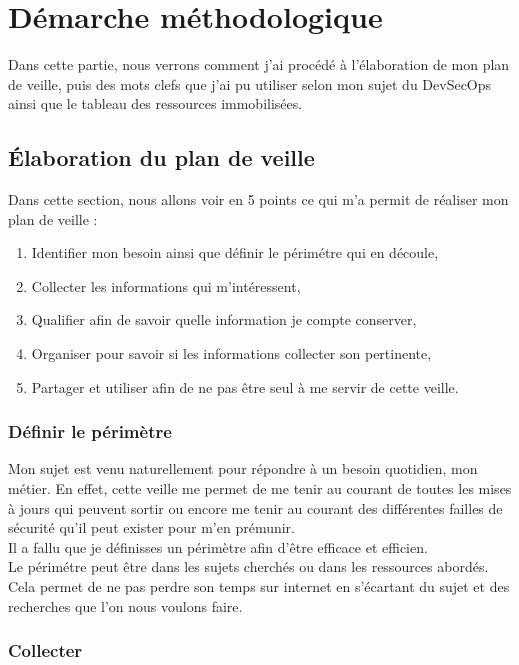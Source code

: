 \documentclass[11pt,a4paper,oneside]{book}
\begin{document}
\chapter{Démarche méthodologique}

Dans cette partie, nous verrons comment j'ai procédé à l'élaboration de mon plan de veille, puis des mots clefs que j'ai pu utiliser selon mon sujet du DevSecOps ainsi que le tableau des ressources immobilisées.

\section{Élaboration du plan de veille}

Dans cette section, nous allons voir en 5 points ce qui m'a permit de réaliser mon plan de veille :
\begin{enumerate}
\item Identifier mon besoin ainsi que définir le périmétre qui en découle,
\item Collecter les informations qui m'intéressent,
\item Qualifier afin de savoir quelle information je compte conserver,
\item Organiser pour savoir si les informations collecter son pertinente,
\item Partager et utiliser afin de ne pas être seul à me servir de cette veille.
\end{enumerate}


\subsection{Définir le périmètre}

Mon sujet est venu naturellement pour répondre à un besoin quotidien, mon métier.
En effet, cette veille me permet de me tenir au courant de toutes les mises à jours qui peuvent sortir ou encore me tenir au courant des différentes failles de sécurité qu'il peut exister pour m'en prémunir. \\
Il a fallu que je définisses un périmètre afin d'être efficace et efficien. \\
Le périmétre peut être dans les sujets cherchés ou dans les ressources abordés.
Cela permet de ne pas perdre son temps sur internet en s'écartant du sujet et des recherches que l'on nous voulons faire.

\subsection{Collecter}
\end{document}

